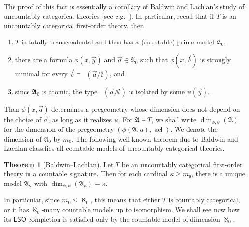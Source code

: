 \documentclass[a4paper]{amsart}
\theoremstyle{definition}
\newtheorem{theorem}[definition]{Theorem}
\theoremstyle{remark}
\newcommand{\A}{\mathcal{A}}
\newcommand{\vy}{\vec{y}}
\DeclareMathOperator{\acl}{acl}
\newcommand\fol{\mathsf{FO}}
\newcommand\eso{\mathsf{ESO}}
\theoremstyle{definition}
\renewcommand{\A}{\mathfrak{A}}
\DeclareMathOperator{\foltype}{tp_\fol}
\begin{document}
The proof of this fact is essentially a corollary of Baldwin and Lachlan's study of uncountably categorical theories (see e.g.~\cite[Section 6.3]{tentziegler}). In particular, recall that if $T$ is an uncountably categorical first-order theory, then
\begin{enumerate}
    \item $T$ is totally transcendental and thus has a (countable) prime model $\A_0$,
    \item there are a formula $\phi(x,\vy)$ and $\vec a\in\A_0$ such that $\phi(x,\vec b)$ is strongly minimal for every $\vec b\models\foltype(\vec a/\emptyset)$, and
    \item since $\A_0$ is atomic, the type $\foltype(\vec a/\emptyset)$ is isolated by some $\psi(\vy)$.
\end{enumerate}
Then $\phi(x,\vec a)$ determines a pregeometry whose dimension does not depend on the choice of $\vec a$, as long as it realizes $\psi$. For $\A\models T$, we shall write $\dim_{\phi,\psi}(\A)$ for the dimension of the pregeometry $(\phi(\A,a),\acl)$. We denote the dimension of $\A_0$ by $m_0$. The following well-known theorem due to Baldwin and Lachlan \cite[Theorem 6.3.7]{tentziegler} classifies all countable models of uncountably categorical theories.

\begin{theorem}[Baldwin--Lachlan]
    Let $T$ be an uncountably categorical first-order theory in a countable signature. Then for each cardinal $\kappa\geq m_0$, there is a unique model $\A_\kappa$ with $\dim_{\phi,\psi}(\A_\kappa)=\kappa$.
\end{theorem}

In particular, since $m_0\leq\aleph_0$, this means that either $T$ is countably categorical, or it has $\aleph_0$-many countable models up to isomorphism. We shall see now how its $\eso$-completion is satisfied only by the countable model of dimension $\aleph_0$.
\end{document}
